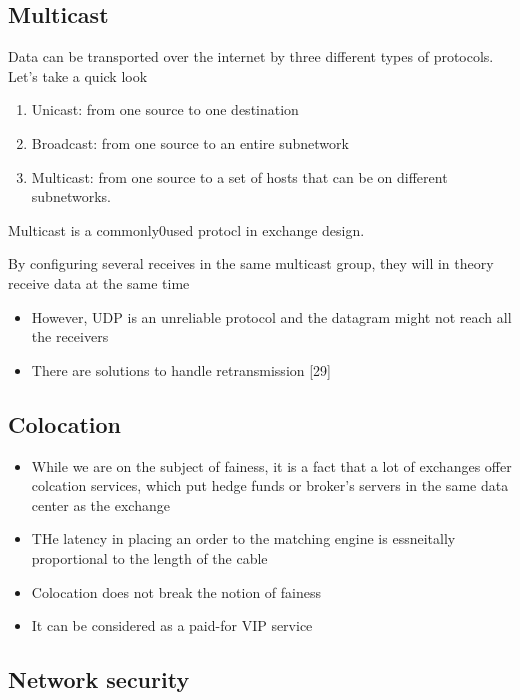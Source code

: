 \documentclass{report}
\theoremstyle{definition}
\let\oldsubsection\subsection
\renewcommand{\subsection}{\oldsubsection*}
\begin{document}
\subsection{Multicast}

Data can be transported over the internet by three different types of protocols. Let's take a quick look

\begin{enumerate}
\item
Unicast: from one source to one destination
\item
Broadcast: from one source to an entire subnetwork
\item
Multicast: from one source to a set of hosts that can be on different subnetworks.
\end{enumerate}

Multicast is a commonly0used protocl in exchange design.

By configuring several receives in the same multicast group, they will in theory receive data at the same time

\begin{itemize}
\item
However, UDP is an unreliable protocol and the datagram might not reach all the receivers
\item
There are solutions to handle retransmission [29]
\end{itemize}

\subsection{Colocation}

\begin{itemize}
\item
While we are on the subject of fainess, it is a fact that a lot of exchanges offer colcation services, which put hedge funds or broker's servers in the same data center as the exchange
\item
THe latency in placing an order to the matching engine is essneitally proportional to the length of the cable
\item
Colocation does not break the notion of fainess
\item
It can be considered as a paid-for VIP service
\end{itemize}

\subsection{Network security}
\end{document}
